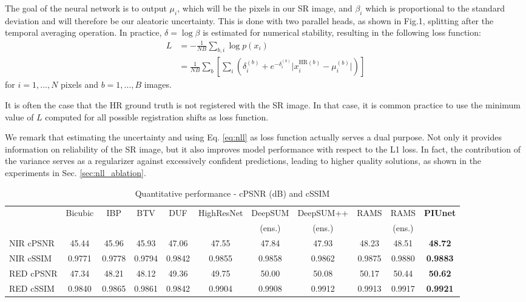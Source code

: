 \documentclass[journal]{IEEEtran}
\begin{document}
The goal of the neural network is to output $\mu_i$, which will be the pixels in our SR image, and $\beta_i$ which is proportional to the standard deviation and will therefore be our aleatoric uncertainty. This is done with two parallel heads, as shown in Fig.1, splitting after the temporal averaging operation. In practice, $\delta = \log \beta$ is estimated for numerical stability, resulting in the following loss function:
\begin{align} \label{eq:nll}
    L &= - \frac{1}{NB} \sum_{b,i} \log p(x_i) \nonumber \\
    &= \frac{1}{NB} \sum_b \left[ \sum_i \left( \delta_i^{(b)} + e^{-\delta_i^{(b)}}\vert x_i^{\text{HR}(b)} - \mu_i^{(b)}  \vert \right) \right] 
\end{align}
for $i=1,\dots,N$ pixels and $b=1,\dots,B$ images.

It is often the case that the HR ground truth is not registered with the SR image. In that case, it is common practice \cite{rarefin2020multi,molini2019deepsum,salvetti2020multi} to use the minimum value of $L$ computed for all possible registration shifts as loss function.

We remark that estimating the uncertainty and using Eq. \eqref{eq:nll} as loss function actually serves a dual purpose. Not only it provides information on reliability of the SR image, but it also improves model performance with respect to the L1 loss. In fact, the contribution of the variance serves as a regularizer against excessively confident predictions, leading to higher quality solutions, as shown in the experiments in Sec. \ref{sec:nll_ablation}.

\begin{table*}[htb]
\centering
\caption{Quantitative performance - cPSNR (dB) and cSSIM}
\label{table:quantitative}
\begin{tabular}{lcccccccccc}
          & \multirow{2}{*}{Bicubic} & \multirow{2}{*}{IBP \cite{IRANI1991231}} & \multirow{2}{*}{BTV \cite{1331445}} & \multirow{2}{*}{DUF \cite{Jo_2018_CVPR}} & HighResNet & DeepSUM  & DeepSUM++ & \multirow{2}{*}{RAMS \cite{salvetti2020multi}} & RAMS \cite{salvetti2020multi} & \multirow{2}{*}{\textbf{PIUnet}} \\
          & & & & & \cite{rarefin2020multi} & (ens.) \cite{molini2019deepsum} & (ens.) \cite{molini2020deepsumpp} & & (ens.) &\\ \hline \hline
NIR cPSNR & 45.44 & 45.96 & 45.93 & 47.06 & 47.55 & 47.84 & 47.93 & 48.23 & 48.51 & \textbf{48.72}  \\
NIR cSSIM & 0.9771 & 0.9778 & 0.9794 & 0.9842 & 0.9855 & 0.9858 & 0.9862 & 0.9875 & 0.9880 & \textbf{0.9883}  \\
RED cPSNR & 47.34 & 48.21 & 48.12 & 49.36 & 49.75 & 50.00 & 50.08 & 50.17 & 50.44 & \textbf{50.62} \\
RED cSSIM & 0.9840 & 0.9865 & 0.9861 & 0.9842 & 0.9904 & 0.9908 & 0.9912 & 0.9913 & 0.9917 & \textbf{0.9921} \\ \hline
\end{tabular}
\end{table*}
\end{document}
